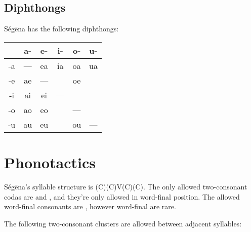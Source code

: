 \subsection{Diphthongs}

Ségēna has the following diphthongs:

\begin{table}[H]
\begin{tabular}{ c|c|c|c|c|c }
	   & a- & e- & i- & o- & u- \\
	\hline
	-a & —  & ea & ia & oa & ua \\
	-e & ae & —  &    & oe &    \\
	-i & ai & ei & —  &    &    \\
	-o & ao & eo &    & —  &    \\
	-u & au & eu &    & ou & —  \\
\end{tabular}
\end{table}

\section{Phonotactics}

Ségēna's syllable structure is (C)(C)V(C)(C). The only allowed two-consonant
codas are  and , and they're only allowed in
word-final position. The allowed word-final consonants are , however word-final  are rare.

The following two-consonant clusters are allowed between adjacent syllables:


